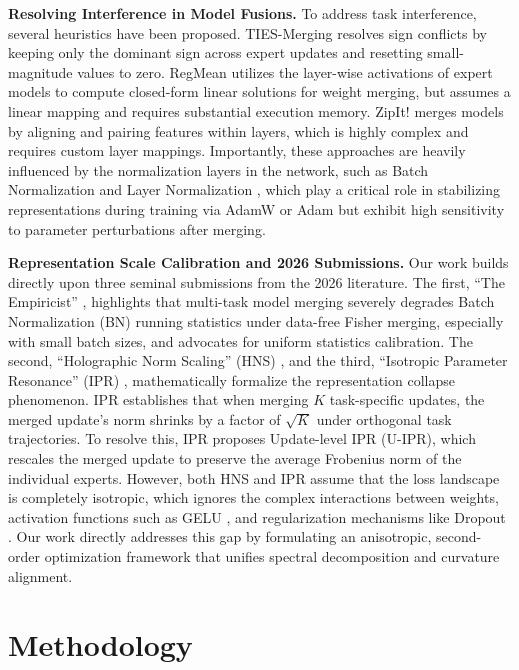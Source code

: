 \documentclass{article}
\theoremstyle{plain}
\theoremstyle{definition}
\theoremstyle{remark}
\begin{document}
\textbf{Resolving Interference in Model Fusions.} To address task interference, several heuristics have been proposed. 
TIES-Merging \cite{yadav2023ties} resolves sign conflicts by keeping only the dominant sign across expert updates and resetting small-magnitude values to zero. 
RegMean \cite{jin2023regmean} utilizes the layer-wise activations of expert models to compute closed-form linear solutions for weight merging, but assumes a linear mapping and requires substantial execution memory. 
ZipIt! \cite{stoica2023zipit} merges models by aligning and pairing features within layers, which is highly complex and requires custom layer mappings. 
Importantly, these approaches are heavily influenced by the normalization layers in the network, such as Batch Normalization \cite{ioffe2015batch} and Layer Normalization \cite{ba2016layer}, which play a critical role in stabilizing representations during training via AdamW \cite{loshchilov2017decoupled} or Adam \cite{kingma2014adam} but exhibit high sensitivity to parameter perturbations after merging.

\textbf{Representation Scale Calibration and 2026 Submissions.} 
Our work builds directly upon three seminal submissions from the 2026 literature. 
The first, ``The Empiricist'' \cite{sub3_empiricist}, highlights that multi-task model merging severely degrades Batch Normalization (BN) running statistics under data-free Fisher merging, especially with small batch sizes, and advocates for uniform statistics calibration. 
The second, ``Holographic Norm Scaling'' (HNS) \cite{sub7_hns}, and the third, ``Isotropic Parameter Resonance'' (IPR) \cite{sub9_ipr}, mathematically formalize the representation collapse phenomenon. 
IPR establishes that when merging $K$ task-specific updates, the merged update's norm shrinks by a factor of $\sqrt{K}$ under orthogonal task trajectories. 
To resolve this, IPR proposes Update-level IPR (U-IPR), which rescales the merged update to preserve the average Frobenius norm of the individual experts. 
However, both HNS and IPR assume that the loss landscape is completely isotropic, which ignores the complex interactions between weights, activation functions such as GELU \cite{hendrycks2016gaussian}, and regularization mechanisms like Dropout \cite{srivastava2014dropout}.
Our work directly addresses this gap by formulating an anisotropic, second-order optimization framework that unifies spectral decomposition and curvature alignment.

\section{Methodology}
\label{submission:method}
\end{document}
